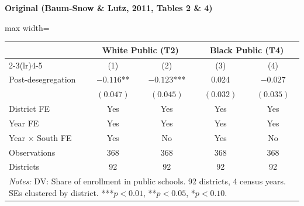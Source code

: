 \documentclass[11pt,a4paper]{article}
\begin{document}
\vspace{0.5cm}
\begin{minipage}[t]{0.48\textwidth}
\centering
\textbf{\large Original (Baum-Snow \& Lutz, 2011, Tables 2 \& 4)}
\vspace{0.3cm}

\begin{adjustbox}{max width=\textwidth}
\begin{tabular}{lcccc}
\toprule
 & \multicolumn{2}{c}{White Public (T2)} & \multicolumn{2}{c}{Black Public (T4)} \\
\cmidrule(lr){2-3}\cmidrule(lr){4-5}
 & (1) & (2) & (3) & (4) \\
\midrule
Post-desegregation & $-0.116$** & $-0.123$*** & 0.024 & $-0.027$ \\
 & $(0.047)$ & $(0.045)$ & $(0.032)$ & $(0.035)$ \\[0.3em]
\midrule
District FE & Yes & Yes & Yes & Yes \\
Year FE & Yes & Yes & Yes & Yes \\
Year $\times$ South FE & Yes & No & Yes & No \\
Observations & 368 & 368 & 368 & 368 \\
Districts & 92 & 92 & 92 & 92 \\
\bottomrule
\multicolumn{5}{p{0.95\textwidth}}{\footnotesize\textit{Notes:} DV: Share of enrollment in public schools. 92 districts, 4 census years. SEs clustered by district. ***$p<0.01$, **$p<0.05$, *$p<0.10$.}
\end{tabular}
\end{adjustbox}
\end{minipage}%
\hfill
\end{document}
